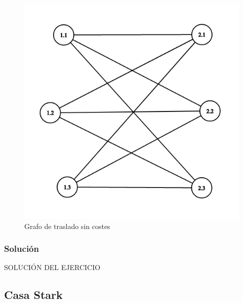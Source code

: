 \documentclass[a4paper,10pt,twocolumn]{article}
\theoremstyle{theorem}
\theoremstyle{definition}
\theoremstyle{remark}
\begin{document}
\begin{figure}[h!]%
	\begin{center}
		\begin{center}
			\includegraphics[scale=.3]{images/graph.png}
		\end{center}
	\caption{Grafo de traslado sin costes}\label{fig:ejer_4_graph}
	\end{center}
\end{figure}


		\subsubsection{Solución}\label{subsubsec:sol_ejer_4}

SOLUCIÓN DEL EJERCICIO

	\subsection{Casa Stark}\label{subsec:ejer_5}
\end{document}
